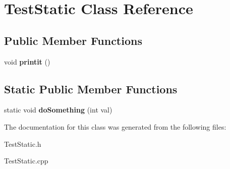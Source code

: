\hypertarget{classTestStatic}{}\section{Test\+Static Class Reference}
\label{classTestStatic}
\subsection*{Public Member Functions}
\begin{DoxyCompactItemize}
\item 
void {\bfseries printit} ()\hypertarget{classTestStatic_af877b62beba36ec427f5a20cf0b261e5}{}\label{classTestStatic_af877b62beba36ec427f5a20cf0b261e5}

\end{DoxyCompactItemize}
\subsection*{Static Public Member Functions}
\begin{DoxyCompactItemize}
\item 
static void {\bfseries do\+Something} (int val)\hypertarget{classTestStatic_af09e079b702a6fba0a9623c136665d90}{}\label{classTestStatic_af09e079b702a6fba0a9623c136665d90}

\end{DoxyCompactItemize}


The documentation for this class was generated from the following files\+:\begin{DoxyCompactItemize}
\item 
Test\+Static.\+h\item 
Test\+Static.\+cpp\end{DoxyCompactItemize}
